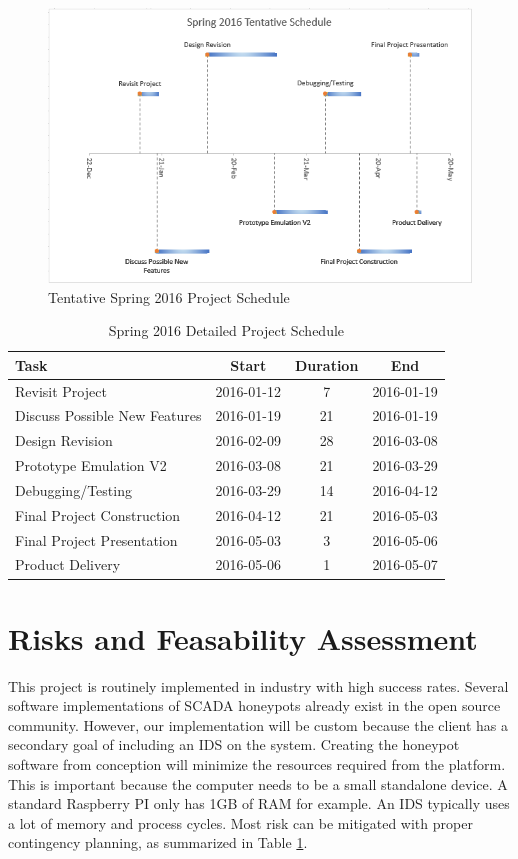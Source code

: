 \begin{figure}
\centering
\includegraphics[scale=0.65]{./figures/spring-timeline}
\caption{Tentative Spring 2016 Project Schedule}
\label{figure:fall-timeline}
\end{figure}

\begin{table}
\centering
\begin{tabular}{l  c  c  c}
Task & Start & Duration & End \\
\hline
Revisit Project	& 2016-01-12 & 7 & 2016-01-19 \\
Discuss Possible New Features & 2016-01-19 & 21 & 2016-01-19 \\
Design Revision & 2016-02-09 & 28 & 2016-03-08 \\
Prototype Emulation V2 & 2016-03-08 & 21 & 2016-03-29 \\
Debugging/Testing & 2016-03-29 & 14 & 2016-04-12 \\
Final Project Construction & 2016-04-12 & 21 & 2016-05-03 \\
Final Project Presentation & 2016-05-03 & 3 & 2016-05-06 \\
Product Delivery & 2016-05-06 & 1 & 2016-05-07 \\
\end{tabular}
\caption{Spring 2016 Detailed Project Schedule}
\label{table:risk}
\end{table}
\vspace{0.3cm}


\section{Risks and Feasability Assessment}

This project is routinely implemented in industry with high success rates. Several software implementations of SCADA honeypots already exist in the open source community. However, our implementation will be custom because the client has a secondary goal of including an IDS on the system. Creating the honeypot software from conception will minimize the resources required from the platform. This is important because the computer needs to be a small standalone device. A standard Raspberry PI only has 1GB of RAM for example. An IDS typically uses a lot of memory and process cycles. Most risk can be mitigated with proper contingency planning, as summarized in Table \ref{table:risk}.


